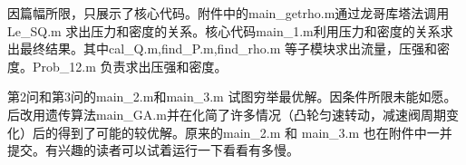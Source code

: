 \documentclass{article}
\begin{document}
因篇幅所限，只展示了核心代码。附件中的main\_getrho.m通过龙哥库塔法调用Le\_SQ.m 求出压力和密度的关系。核心代码main\_1.m利用压力和密度的关系求出最终结果。其中cal\_Q.m,find\_P.m,find\_rho.m 等子模块求出流量，压强和密度。Prob\_12.m 负责求出压强和密度。

第2问和第3问的main\_2.m和main\_3.m 试图穷举最优解。因条件所限未能如愿。后改用遗传算法main\_GA.m并在化简了许多情况（凸轮匀速转动，减速阀周期变化）后的得到了可能的较优解。原来的main\_2.m 和 main\_3.m 也在附件中一并提交。有兴趣的读者可以试着运行一下看看有多慢。



\printindex
\end{document}
